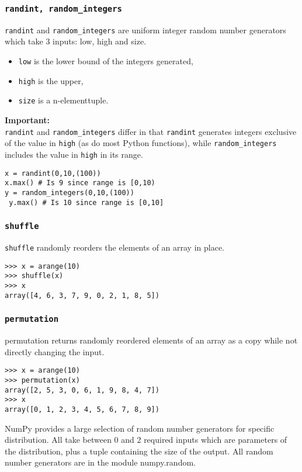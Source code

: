 \documentclass[Pydata.tex]{subfiles}
\begin{document}
\subsubsection{\texttt{randint, random\_integers}}
\texttt{randint} and \texttt{random\_integers} are uniform integer random number generators which take 3 inputs: low,
high and size. 
\begin{itemize}
\item \texttt{low} is the lower bound of the integers generated, 
\item \texttt{high} is the upper,
\item \texttt{size} is a n-elementtuple. 
\end{itemize}

\noindent \textbf{Important:}\\
 \texttt{randint} and \texttt{random\_integers} differ in that \texttt{randint} generates integers exclusive of the value in \texttt{high}
(as do most Python functions), while \texttt{random\_integers} includes the value in \texttt{high} in its range.
\begin{framed}
\begin{verbatim}
x = randint(0,10,(100))
x.max() # Is 9 since range is [0,10)
y = random_integers(0,10,(100))
 y.max() # Is 10 since range is [0,10]
\end{verbatim}
\end{framed}
\subsubsection{\texttt{shuffle}}
\texttt{shuffle} randomly reorders the elements of an array in place.
\begin{framed}
\begin{verbatim}
>>> x = arange(10)
>>> shuffle(x)
>>> x
array([4, 6, 3, 7, 9, 0, 2, 1, 8, 5])
\end{verbatim}
\end{framed}
\subsubsection{\texttt{permutation}}
permutation returns randomly reordered elements of an array as a copy while not directly changing the
input.
\begin{framed}
\begin{verbatim}
>>> x = arange(10)
>>> permutation(x)
array([2, 5, 3, 0, 6, 1, 9, 8, 4, 7])
>>> x
array([0, 1, 2, 3, 4, 5, 6, 7, 8, 9])
\end{verbatim}
\end{framed}
NumPy provides a large selection of random number generators for specific distribution. All take between
0 and 2 required inputs which are parameters of the distribution, plus a tuple containing the size of the
output. All random number generators are in the module numpy.random.
%
\end{document}

